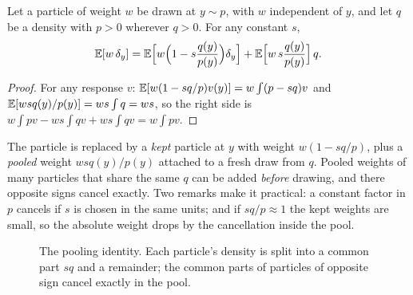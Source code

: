 \begin{lemma}[Pooling]\label{lem:pooling}
Let a particle of weight $w$ be drawn at $y\sim p$, with $w$ independent of $y$, and let $q$ be a
density with $p>0$ wherever $q>0$. For any constant $s$,
\begin{equation}
\mathbb E[w\,\delta_y]=\mathbb E\Big[w\Big(1-s\frac{q(y)}{p(y)}\Big)\delta_y\Big]+\mathbb E\Big[w\,s\frac{q(y)}{p(y)}\Big]\,q .
\end{equation}
\end{lemma}
\begin{proof}
For any response $v$: $\mathbb E[w(1-sq/p)v(y)]=w\int(p-sq)v$ and $\mathbb E[wsq(y)/p(y)]=ws\int q=ws$, so the
right side is $w\int pv-ws\int qv+ws\int qv=w\int pv$.
\end{proof}
The particle is replaced by a \emph{kept} particle at $y$ with weight $w(1-sq/p)$, plus a
\emph{pooled} weight $wsq(y)/p(y)$ attached to a fresh draw from $q$. Pooled weights of many particles
that share the same $q$ can be added \emph{before} drawing, and there opposite signs cancel exactly.
Two remarks make it practical: a constant factor in $p$ cancels if $s$ is chosen in the same units;
and if $sq/p\approx1$ the kept weights are small, so the absolute weight drops by the cancellation
inside the pool.

\begin{figure}[t]\centering
{}
\caption{The pooling identity. Each particle's density is split into a common part $sq$ and a
remainder; the common parts of particles of opposite sign cancel exactly in the pool.}\label{fig:pooling}
\end{figure}

